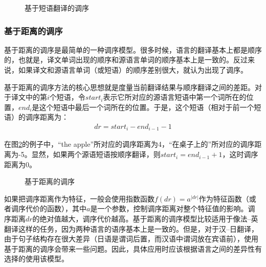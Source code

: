 \begin{figure}[htp]
\centering

\caption{基于短语翻译的调序}
\label{fig:4-19}
\end{figure}


\subsubsection{基于距离的调序}

\parinterval 基于距离的调序是最简单的一种调序模型。很多时候，语言的翻译基本上都是顺序的，也就是，译文单词出现的顺序和源语言单词的顺序基本上是一致的。反过来说，如果译文和源语言单词（或短语）的顺序差别很大，就认为出现了调序。

\parinterval 基于距离的调序方法的核心思想就是度量当前翻译结果与顺序翻译之间的差距。对于译文中的第$i$个短语，令$start_i$表示它所对应的源语言短语中第一个词所在的位置，$end_i$是这个短语中最后一个词所在的位置。于是，这个短语（相对于前一个短语）的调序距离为：
\begin{eqnarray}
dr = start_i-end_{i-1}-1
\label{eq:4-15}
\end{eqnarray}

\parinterval 在图\ref{fig:4-20}的例子中，``the apple''所对应的调序距离为4，``在桌子上的''所对应的调序距离为-5。显然，如果两个源语短语按顺序翻译，则$start_i = end_{i-1} + 1$，这时调序距离为0。

\begin{figure}[htp]
\centering

\caption{基于距离的调序}
\label{fig:4-20}
\end{figure}

\parinterval 如果把调序距离作为特征，一般会使用指数函数$f(dr) = a^{|dr|}$作为特征函数（或者调序代价的函数），其中$a$是一个参数，控制调序距离对整个特征值的影响。调序距离$dr$的绝对值越大，调序代价越高。基于距离的调序模型比较适用于像法–英翻译这样的任务，因为两种语言的语序基本上是一致的。但是，对于汉–日翻译，由于句子结构存在很大差异（日语是谓词后置，而汉语中谓词放在宾语前），使用基于距离的调序会带来一些问题。因此，具体应用时应该根据语言之间的差异性有选择的使用该模型。

